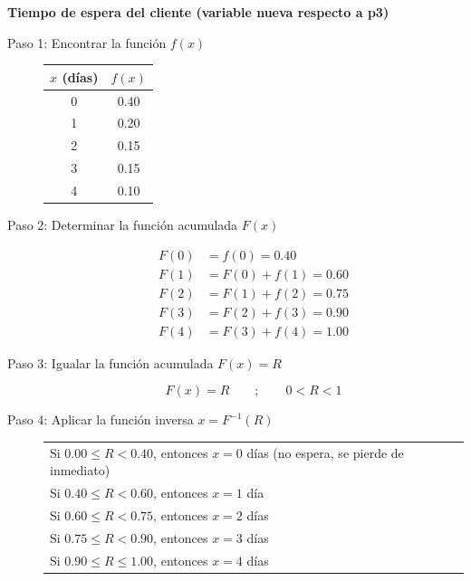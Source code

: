 \textbf{Tiempo de espera del cliente (variable nueva respecto a p3)}

\begin{description}
    \item[Paso 1: Encontrar la función $f(x)$]

    \begin{center}
    \begin{tabular}{cc}
    \toprule
    $x$ (días) & $f(x)$ \\
    \midrule
    0 & 0.40 \\ 1 & 0.20 \\ 2 & 0.15 \\ 3 & 0.15 \\ 4 & 0.10 \\
    \bottomrule
    \end{tabular}
    \end{center}

    \item[Paso 2: Determinar la función acumulada $F(x)$]

    \begin{align*}
    F(0) &= f(0) = 0.40 \\
    F(1) &= F(0)+f(1) = 0.60 \\
    F(2) &= F(1)+f(2) = 0.75 \\
    F(3) &= F(2)+f(3) = 0.90 \\
    F(4) &= F(3)+f(4) = 1.00
    \end{align*}

    \item[Paso 3: Igualar la función acumulada $F(x) = R$]

    $$ F(x)=R \qquad ; \qquad 0 < R < 1 $$

    \item[Paso 4: Aplicar la función inversa $x=F^{-1}(R)$]

    \begin{center}
    \begin{tabular}{l}
    Si $0.00 \leq R < 0.40$, entonces $x=0$ días (no espera, se pierde de inmediato) \\
    Si $0.40 \leq R < 0.60$, entonces $x=1$ día \\
    Si $0.60 \leq R < 0.75$, entonces $x=2$ días \\
    Si $0.75 \leq R < 0.90$, entonces $x=3$ días \\
    Si $0.90 \leq R \leq 1.00$, entonces $x=4$ días \\
    \end{tabular}
    \end{center}


\end{description}
